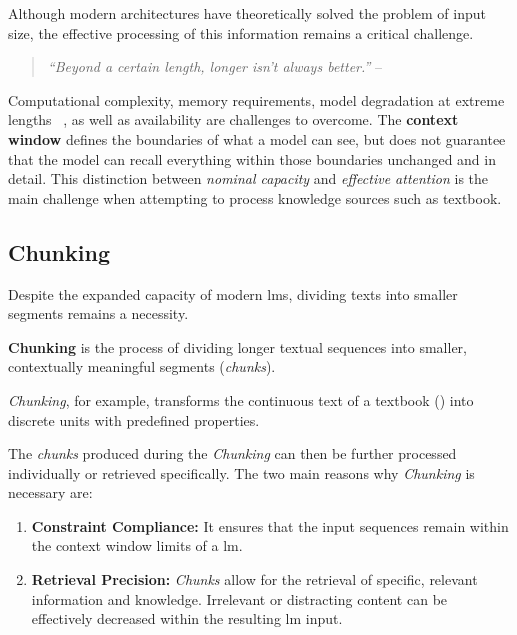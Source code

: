 Although modern architectures have theoretically solved the problem of input size, the effective processing of this information remains a critical challenge.
\begin{quote}
\small
\textit{“Beyond a certain length, longer isn’t always better.”} – \citet{liu2024lostmiddle}
\end{quote}
Computational complexity, memory requirements, model degradation at extreme lengths ~\citep{liu2024lostmiddle}, as well as availability are challenges to overcome.
The \textbf{context window} defines the boundaries of what a model can see, but does not guarantee that the model can recall everything within those boundaries unchanged and in detail.
This distinction between \textit{nominal capacity} and \textit{effective attention} is the main challenge when attempting to process knowledge sources such as \citet{bb2} textbook.
%
\subsection{Chunking}\label{sub:chunking_prel}
Despite the expanded capacity of modern \acp{lm}, dividing texts into smaller segments remains a necessity.
%
\begin{definition}
\textbf{Chunking} is the process of dividing longer textual sequences into smaller, contextually meaningful segments (\textit{chunks}).
\end{definition}
\textit{Chunking}, for example, transforms the continuous text of a textbook (\citet{bb2}) into discrete units with predefined properties.

The \textit{chunks} produced during the \textit{Chunking} can then be further processed individually or retrieved specifically.
The two main reasons why \textit{Chunking} is necessary are:
\begin{enumerate}
    \item \textbf{Constraint Compliance:} It ensures that the input sequences remain within the context window limits of a \ac{lm}.
    \item \textbf{Retrieval Precision:} \textit{Chunks} allow for the retrieval of specific, relevant information and knowledge.
    Irrelevant or distracting content can be effectively decreased within the resulting \ac{lm} input.
\end{enumerate}
%
